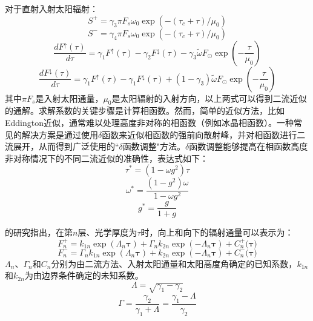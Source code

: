 对于直射入射太阳辐射：
\begin{equation}
S^{+} = \gamma_{3}\pi F_{s}\omega_{0}\exp\left( - \left( \tau_{c} + \tau \right)/\mu_{0} \right)
\end{equation}
\begin{equation}
S^{-} = \gamma_{4}\pi F_{s}\omega_{0}\exp\left( - \left( \tau_{c} + \tau \right)/\mu_{0} \right)
\end{equation}
\begin{equation}
\frac{dF^{\uparrow}(\tau)}{d\tau} = \gamma_{1}F^{\uparrow}(\tau) - \gamma_{2}F^{\downarrow}(\tau) - \gamma_{3}\widetilde{\omega}F_{\odot}\exp( - \frac{\tau}{\mu_{0}})
\end{equation}
\begin{equation}
\frac{dF^{\downarrow}(\tau)}{d\tau} = \gamma_{1}F^{\uparrow}(\tau) - \gamma_{1}F^{\downarrow}(\tau) + (1 - \gamma_{3})\widetilde{\omega}F_{\odot}\exp( - \frac{\tau}{\mu_{0}})
\end{equation}
其中\(\pi F_{s}\)是入射太阳通量，\(\mu_{0}\)是太阳辐射的入射方向，以上两式可以得到二流近似的通解。求解系数的关键步骤是计算相函数。然而，简单的近似方法，比如Eddington近似，通常难以处理高度非对称的相函数（例如冰晶相函数）。一种常见的解决方案是通过使用$\delta$函数来近似相函数的强前向散射峰，并对相函数进行二流展开，从而得到广泛使用的``$\delta$函数调整"方法\citep{joseph1976DeltaEddingtonApproximationRadiative}。$\delta$函数调整能够提高在相函数高度非对称情况下的不同二流近似的准确性，表达式如下：
\begin{equation}
\tau^{*} = (1 - \omega g^{2})\tau
\end{equation}
\begin{equation}
\omega^{*} = \frac{(1 - g^{2})\omega}{1 - \omega g^{2}}
\end{equation}
\begin{equation}
g^{*} = \frac{g}{1 + g}
\end{equation}

\citet{meador1980TwostreamApproximationsRadiative}的研究指出，在第$n$层、光学厚度为\(\tau\)时，向上和向下的辐射通量可以表示为：
\begin{equation}
F_{n}^{+} = k_{1n}\exp\left( \Lambda_{n}\mathbf{\tau} \right) + \Gamma_{n}k_{2n}\exp\left( {- \Lambda}_{n}\mathbf{\tau} \right) + C_{n}^{+}(\mathbf{\tau)}
\end{equation}
\begin{equation}
F_{n}^{-} = \Gamma_{n}k_{1n}\exp\left( \Lambda_{n}\mathbf{\tau} \right) + k_{2n}\exp\left( {- \Lambda}_{n}\mathbf{\tau} \right) + C_{n}^{-}(\mathbf{\tau)}
\end{equation}
%
\(\Lambda_{n}\)、\(\Gamma_{n}\)和\(C_{n}\)分别为由二流方法、入射太阳通量和太阳高度角确定的已知系数，\(k_{1n}\)和\(k_{2n}\)为由边界条件确定的未知系数。
\begin{equation}
\Lambda = \sqrt{\gamma_{1} - \gamma_{2}}
\end{equation}
\begin{equation}
\Gamma = \frac{\gamma_{2}}{\gamma_{1} + \Lambda} = \frac{\gamma_{1} - \Lambda}{\gamma_{2}}
\end{equation}

